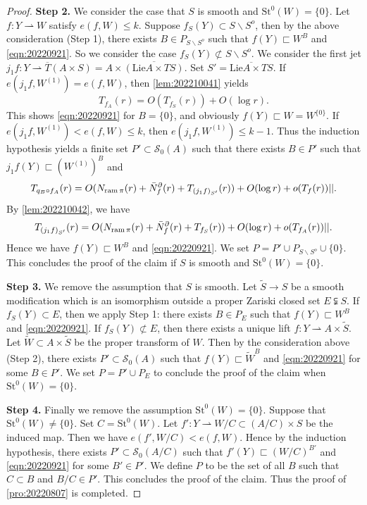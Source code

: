 \documentclass[11pt,english]{smfart}
\theoremstyle{plain}
\theoremstyle{definition}
\theoremstyle{remark}
\numberwithin{equation}{section}
\theoremstyle{plain}
\newcommand{\da}{\rightharpoonup}
\newcommand{\pN}[1]{\bar{N}_{#1}^{\partial}}
\newcommand{\ram}{{\rm ram}\,}
\begin{document}
\begin{proof}
		
		
		
		
		
		
		
		\textbf{Step 2.}
		We consider the case that $S$ is smooth and $\mathrm{St}^0(W)=\{0\}$.
		Let $f:Y\da W$ satisfy $e(f,W)\leq k$.
		Suppose $f_S(Y)\subset S\backslash S^o$, then by the above consideration (Step 1), there exists $B\in P_{S\backslash S^o}$ such that $f(Y)\sqsubset W^B$ and \eqref{eqn:20220921}.
		So we consider the case $f_S(Y)\not\subset S\backslash S^o$.
		We consider the first jet $j_1f:Y\da \overline{T}(A\times S)=A\times \overline{(\mathrm{Lie}A\times TS)}$.
		Set $S'=\overline{\mathrm{Lie}A\times TS}$.
		If $e(j_1f,W^{(1)})=e(f,W)$, then \cref{lem:202210041} yields 
		$$T_{f_A}(r)=O(T_{f_{S}}(r))+O(\log r).$$
		This shows \eqref{eqn:20220921} for $B=\{0\}$, and obviously $f(Y)\sqsubset W= W^{\{0\}}$.
		If $e(j_1f,W^{(1)})<e(f,W)\leq k$, then $e(j_1f,W^{(1)})\leq k-1$.
		Thus the induction hypothesis yields a finite set $P'\subset \mathcal{S}_0(A)$ such that there exists $B\in P'$ such that $j_1f(Y)\sqsubset (W^{(1)})^B$ and 
		$$T_{q_B\circ f_A}(r)=O(N_{\ram\pi}(r)+\pN{f}(r)+T_{(j_1f)_{S'}}(r))+O(\log r)+o(T_f(r))||.$$
		By \cref{lem:202210042}, we have 
		$$T_{(j_1f)_{S'}}(r)=O(N_{\ram\pi}(r)+\pN{f}(r)+T_{f_S}(r))+O(\log r)+o(T_{f_A}(r))||.$$
		Hence we have $f(Y)\sqsubset W^B$ and \eqref{eqn:20220921}.
		We set $P=P'\cup P_{S\backslash S^o}\cup\{0\}$.
		This concludes the proof of the claim if $S$ is smooth and $\mathrm{St}^0(W)=\{0\}$.
		
		\textbf{Step 3.}
		We remove the assumption that $S$ is smooth.
		Let $\widetilde{S}\to S$ be a smooth modification which is an isomorphism outside a proper Zariski closed set $E\subsetneqq S$.
		If $f_S(Y)\subset E$, then we apply Step 1: there exists $B\in P_{E}$ such that $f(Y)\sqsubset W^B$ and \eqref{eqn:20220921}.
		If $f_S(Y)\not\subset E$, then there exists a unique lift $f:Y\da A\times \widetilde{S}$.
		Let $\widetilde{W}\subset A\times \widetilde{S}$ be the proper transform of $W$.
		Then by the consideration above (Step 2), there exists $P'\subset \mathcal{S}_0(A)$ such that $f(Y)\sqsubset \widetilde{W}^B$ and \eqref{eqn:20220921} for some $B\in P'$.
		We set $P=P'\cup P_E$ to conclude the proof of the claim when $\mathrm{St}^0(W)=\{0\}$.
		
		
		\textbf{Step 4.}
		Finally we remove the assumption $\mathrm{St}^0(W)=\{0\}$.
		Suppose that $\mathrm{St}^0(W)\not=\{0\}$.
		Set $C=\mathrm{St}^0(W)$.
		Let $f':Y\da W/C\subset (A/C)\times S$ be the induced map.
		Then we have $e(f',W/C)<e(f,W)$.
		Hence by the induction hypothesis, there exists $P'\subset \mathcal{S}_0(A/C)$ such that $f'(Y)\sqsubset (W/C)^{B'}$ and \eqref{eqn:20220921} for some $B'\in P'$.	 	
		We define $P$ to be the set of all $B$ such that $C\subset B$ and $B/C\in P'$.
		This concludes the proof of the claim.
		Thus the proof of \cref{pro:20220807} is completed.
	\end{proof}
	
\end{document}
